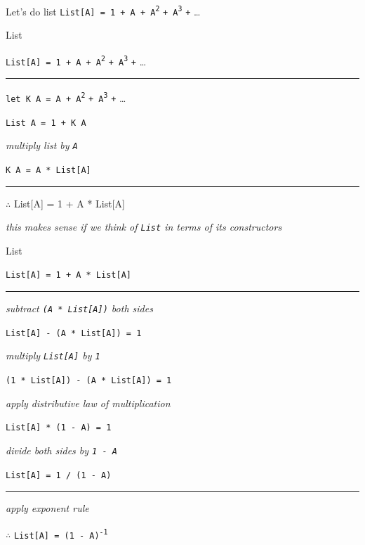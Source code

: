 \begin{frame}
\begin{block}{Let's do list}
\lstinline{List[A] = 1 + A + A}\textsuperscript{\lstinline{2}} \lstinline{+ A}\textsuperscript{\lstinline{3}} \lstinline{+} \ldots
\end{block}
\end{frame}

\begin{frame}{List}

\lstinline{List[A] = 1 + A + A}\textsuperscript{\lstinline{2}} \lstinline{+ A}\textsuperscript{\lstinline{3}} \lstinline{+} \ldots

\par\noindent\rule{\textwidth}{0.4pt}

\lstinline{let K A = A + A}\textsuperscript{\lstinline{2}} \lstinline{+ A}\textsuperscript{\lstinline{3}} \lstinline{+} \ldots

\lstinline{List A = 1 + K A}

\emph{\tiny{multiply list by \lstinline{A}}}

\lstinline{K A = A * List[A]}

\par\noindent\rule{\textwidth}{0.4pt}

{$\therefore$} List[A] = 1 + A * List[A]

\emph{\tiny{this makes sense if we think of \lstinline{List} in terms of its constructors}}

\end{frame}


\begin{frame}{List}

\lstinline{List[A] = 1 + A * List[A]}

\par\noindent\rule{\textwidth}{0.4pt}

\emph{\tiny{subtract \lstinline{(A * List[A])} both sides}}

\lstinline{List[A] - (A * List[A]) = 1}

\emph{\tiny{multiply \lstinline{List[A]} by \lstinline{1}}}

\lstinline{(1 * List[A]) - (A * List[A]) = 1}

\emph{\tiny{apply distributive law of multiplication}}

\lstinline{List[A] * (1 - A) = 1}

\emph{\tiny{divide both sides by \lstinline{1 - A}}}

\lstinline{List[A] = 1 / (1 - A)}

\par\noindent\rule{\textwidth}{0.4pt}

\emph{\tiny{apply exponent rule}}

{$\therefore$} \lstinline{List[A] = (1 - A)}\textsuperscript{\lstinline{-1}}

\end{frame}


